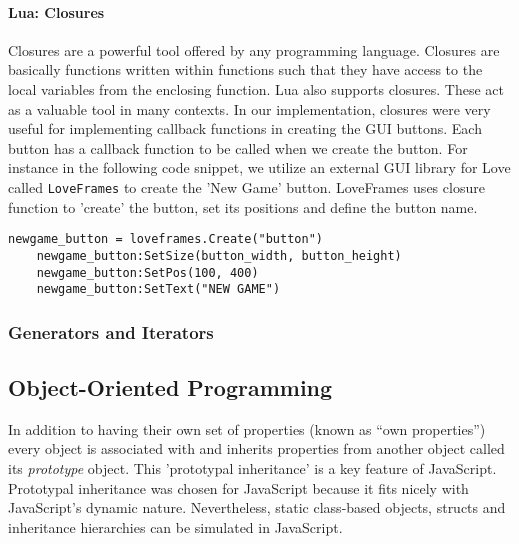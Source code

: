 \paragraph{Lua: Closures}
Closures are a powerful tool offered by any programming language. Closures are basically functions written within functions such that they have access to the local variables from the enclosing function. Lua also supports closures. These act as a valuable tool in many contexts. In our implementation, closures were very useful for implementing callback functions in creating the GUI buttons. Each button has a callback function to be called when we create the button. For instance in the following code snippet, we utilize an external GUI library for Love called \texttt{LoveFrames} to create the 'New Game' button. LoveFrames uses closure function to 'create' the button, set its positions and define the button name.
\begin{lstlisting}[language={[5.2]Lua},caption= Declaring and initializing metatables in Lua]
newgame_button = loveframes.Create("button")
    newgame_button:SetSize(button_width, button_height)
    newgame_button:SetPos(100, 400)
    newgame_button:SetText("NEW GAME")
\end{lstlisting}
    

\subsubsection{Generators and Iterators}


\subsection{Object-Oriented Programming}
\label{oop}


In addition to having their own set of properties (known as ``own properties'') every
object is associated with and inherits properties from another object called its
\emph{prototype} object. This 'prototypal inheritance' is a key feature of JavaScript.
Prototypal inheritance was chosen for JavaScript because it fits nicely with JavaScript's
dynamic nature. Nevertheless, static class-based
objects, structs and inheritance hierarchies can be simulated in JavaScript. 

